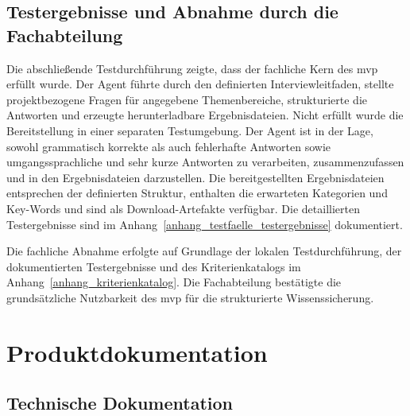 \documentclass[
  10pt,
  ngerman,
  a4paper,
  toc=graduated,
  numbers=noenddot,
  headings=standardclasses,
  nonumberlist
]{scrartcl}
\begin{document}
\subsection{Testergebnisse und Abnahme durch die Fachabteilung}
\label{testergebnisse_und_abnahme_durch_die_fachabteilung}

Die abschließende Testdurchführung zeigte, dass der fachliche Kern des \gls{mvp} erfüllt wurde. Der Agent führte durch den definierten Interviewleitfaden, stellte projektbezogene Fragen für angegebene Themenbereiche, strukturierte die Antworten und erzeugte herunterladbare Ergebnisdateien. Nicht erfüllt wurde die Bereitstellung in einer separaten Testumgebung. Der Agent ist in der Lage, sowohl grammatisch korrekte als auch fehlerhafte Antworten sowie umgangssprachliche und sehr kurze Antworten zu verarbeiten, zusammenzufassen und in den Ergebnisdateien darzustellen. Die bereitgestellten Ergebnisdateien entsprechen der definierten Struktur, enthalten die erwarteten Kategorien und Key-Words und sind als Download-Artefakte verfügbar. Die detaillierten Testergebnisse sind im Anhang~\ref{anhang_testfaelle_testergebnisse} dokumentiert.

Die fachliche Abnahme erfolgte auf Grundlage der lokalen Testdurchführung, der dokumentierten Testergebnisse und des Kriterienkatalogs im Anhang~\ref{anhang_kriterienkatalog}. Die Fachabteilung bestätigte die grundsätzliche Nutzbarkeit des \gls{mvp} für die strukturierte Wissenssicherung.

\section{Produktdokumentation}
\label{produktdokumentation}

\subsection{Technische Dokumentation}
\label{technische_dokumentation}
\end{document}
